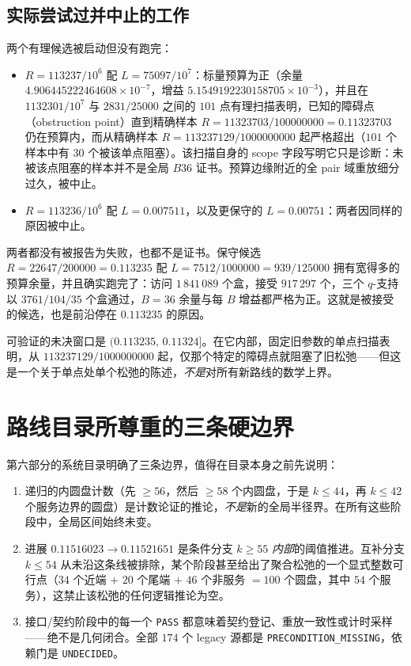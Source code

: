 \subsection{实际尝试过并中止的工作}

两个有理候选被启动但没有跑完：

\begin{itemize}[leftmargin=1.4em,itemsep=2pt]
\item $R=113237/10^{6}$ 配 $L=75097/10^{7}$：标量预算为正（余量 $4.906445222464608\times10^{-7}$，增益 $5.1549192230158705\times10^{-3}$），并且在 $1132301/10^{7}$ 与 $2831/25000$ 之间的 $101$ 点有理扫描表明，已知的障碍点（obstruction point）直到精确样本 $R=11323703/100000000=0.11323703$ 仍在预算内，而从精确样本 $R=113237129/1000000000$ 起严格超出（$101$ 个样本中有 $30$ 个被该单点阻塞）。该扫描自身的 scope 字段写明它只是诊断：未被该点阻塞的样本并不是全局 $B36$ 证书。预算边缘附近的全 pair 域重放细分过久，被中止。
\item $R=113236/10^{6}$ 配 $L=0.007511$，以及更保守的 $L=0.00751$：两者因同样的原因被中止。
\end{itemize}

两者都没有被报告为失败，也都不是证书。保守候选 $R=22647/200000=0.113235$ 配 $L=7512/1000000=939/125000$ 拥有宽得多的预算余量，并且确实跑完了：访问 $1\,841\,089$ 个盒，接受 $917\,297$ 个，三个 $q$-支持以 $3761/104/35$ 个盒通过，$B=36$ 余量与每 $B$ 增益都严格为正。这就是被接受的候选，也是前沿停在 $0.113235$ 的原因。

\begin{remark}[精确陈述的未决窗口]
可验证的未决窗口是 $(0.113235,\,0.11324]$。在它内部，固定旧参数的单点扫描表明，从 $113237129/1000000000$ 起，仅那个特定的障碍点就阻塞了旧松弛——但这是一个关于单点处单个松弛的陈述，\emph{不是}对所有新路线的数学上界。
\end{remark}

\section{路线目录所尊重的三条硬边界}

第六部分的系统目录明确了三条边界，值得在目录本身之前先说明：

\begin{enumerate}[leftmargin=1.6em,itemsep=3pt]
\item 递归的内圆盘计数（先 $\ge56$，然后 $\ge58$ 个内圆盘，于是 $k\le44$，再 $k\le42$ 个服务边界的圆盘）是计数论证的推论，\emph{不是}新的全局半径界。在所有这些阶段中，全局区间始终未变。
\item 进展 $0.11516023\to0.11521651$ 是条件分支 $k\ge55$ \emph{内部}的阈值推进。互补分支 $k\le54$ 从未沿这条线被排除，某个阶段甚至给出了聚合松弛的一个显式整数可行点（$34$ 个近端 $+$ $20$ 个尾端 $+$ $46$ 个非服务 $=100$ 个圆盘，其中 $54$ 个服务），这禁止该松弛的任何逻辑推论为空。
\item 接口/契约阶段中的每一个 \texttt{PASS} 都意味着契约登记、重放一致性或计时采样——绝不是几何闭合。全部 $174$ 个 legacy 源都是 \texttt{PRECONDITION\_\allowbreak{}MISSING}，依赖门是 \texttt{UNDECIDED}。
\end{enumerate}

